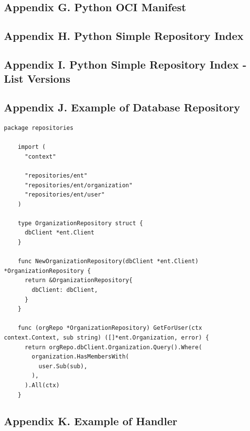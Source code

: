 \documentclass{article}
\begin{document}
  \subsection{Appendix G. Python OCI Manifest}
  \label{sec:appendix-g}

  

  \subsection{Appendix H. Python Simple Repository Index}
  \label{sec:appendix-h}

  

  \subsection{Appendix I. Python Simple Repository Index - List Versions}
  \label{sec:appendix-i}

  

  \subsection{Appendix J. Example of Database Repository}
  \label{sec:appendix-j}

  \begin{lstlisting}[language=Golang]
    package repositories

    import (
      "context"

      "repositories/ent"
      "repositories/ent/organization"
      "repositories/ent/user"
    )

    type OrganizationRepository struct {
      dbClient *ent.Client
    }

    func NewOrganizationRepository(dbClient *ent.Client) *OrganizationRepository {
      return &OrganizationRepository{
        dbClient: dbClient,
      }
    }

    func (orgRepo *OrganizationRepository) GetForUser(ctx context.Context, sub string) ([]*ent.Organization, error) {
      return orgRepo.dbClient.Organization.Query().Where(
        organization.HasMembersWith(
          user.Sub(sub),
        ),
      ).All(ctx)
    }
  \end{lstlisting}

  \subsection{Appendix K. Example of Handler}
  \label{sec:appendix-k}
\end{document}
